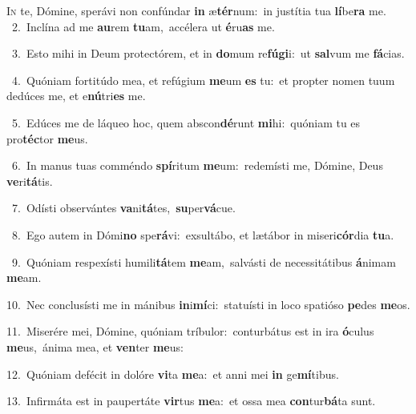 \lettrine{\initial\textcolor{\initialcolor}{I}}{n} te, Dómine, sperávi non confúndar \textbf{in} æ\-\textbf{tér}\-num:~\star in justítia tua \textbf{lí}\-be\textbf{ra} me.\\
{\numbfont\textcolor{\numbcolor}{~2.}}~Inclína ad me \textbf{au}\-rem \textbf{tu}\-am,~\star accélera ut \textbf{é}\-ru\textbf{as} me.\par
{\numbfont\textcolor{\numbcolor}{~3.}}~Esto mihi in Deum protectórem, et in \textbf{do}\-mum re\-\textbf{fú}\-\textbf{gi}i:~\star ut \textbf{sal}\-vum me \textbf{fá}\-cias.\par
{\numbfont\textcolor{\numbcolor}{~4.}}~Quóniam fortitúdo mea, et refúgium \textbf{me}\-um \textbf{es} tu:~\star et propter nomen tuum dedúces me, et e\-\textbf{nú}\-tri\textbf{es} me.\par
{\numbfont\textcolor{\numbcolor}{~5.}}~Edúces me de láqueo hoc, quem abscon\-\textbf{dé}\-runt \textbf{mi}\-hi:~\star quóniam tu es pro\-\textbf{téc}\-tor \textbf{me}\-us.\par
{\numbfont\textcolor{\numbcolor}{~6.}}~In manus tuas comméndo \textbf{spí}\-ritum \textbf{me}\-um:~\star redemísti me, Dómine, Deus \textbf{ve}\-ri\-\textbf{tá}\-tis.\par
{\numbfont\textcolor{\numbcolor}{~7.}}~Odísti observántes \textbf{va}\-ni\-\textbf{tá}\-tes,~\star \textbf{su}\-per\-\textbf{vá}\-cue.\par
{\numbfont\textcolor{\numbcolor}{~8.}}~Ego autem in Dómi\textbf{no} spe\-\textbf{rá}\-vi:~\star exsultábo, et lætábor in miseri\-\textbf{cór}\-dia \textbf{tu}\-a.\par
{\numbfont\textcolor{\numbcolor}{~9.}}~Quóniam respexísti humili\-\textbf{tá}\-tem \textbf{me}\-am,~\star salvásti de necessitátibus \textbf{á}\-nimam \textbf{me}\-am.\par
{\numbfont\textcolor{\numbcolor}{10.}}~Nec conclusísti me in mánibus \textbf{in}\-i\-\textbf{mí}\-ci:~\star statuísti in loco spatióso \textbf{pe}\-des \textbf{me}\-os.\par
{\numbfont\textcolor{\numbcolor}{11.}}~Miserére mei, Dómine, quóniam tríbulor:~\dagger conturbátus est in ira \textbf{ó}\-culus \textbf{me}\-us,~\star ánima mea, et \textbf{ven}\-ter \textbf{me}\-us:\par
{\numbfont\textcolor{\numbcolor}{12.}}~Quóniam defécit in dolóre \textbf{vi}\-ta \textbf{me}\-a:~\star et anni mei \textbf{in} ge\-\textbf{mí}\-tibus.\par
{\numbfont\textcolor{\numbcolor}{13.}}~Infirmáta est in paupertáte \textbf{vir}\-tus \textbf{me}\-a:~\star et ossa mea \textbf{con}\-tur\-\textbf{bá}\-ta sunt.\par
